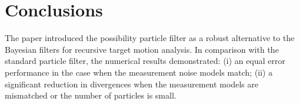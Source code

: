 \documentclass{llncs}
\begin{document}
\section{Conclusions}
\label{VI}

The paper introduced the possibility particle filter as a robust alternative to the Bayesian filters for recursive target motion analysis. In comparison with the standard particle filter, the numerical results demonstrated: (i) an equal error performance in the case when the measurement noise models match; (ii) a significant reduction in divergences when the measurement models are mismatched or the number of particles is small.


%


%
%
\end{document}
